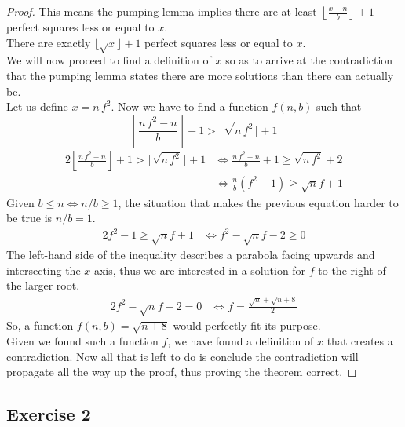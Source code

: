 {\begin{proof}
This means the pumping lemma implies there are at least $\left\lfloor \frac{x-n}{b} \right\rfloor +1$ perfect squares less or equal to $x$.\\
There are exactly $\lfloor \sqrt{x} \rfloor +1$ perfect squares less or equal to $x$.\\
We will now proceed to find a definition of $x$ so as to arrive at the contradiction that the pumping lemma states there are more solutions than there can actually be.\\
Let us define $x=n\,f^2$. Now we have to find a function $f(n,b)$ such that
\begin{equation*}
	\left\lfloor \frac{n\,f^2-n}{b} \right\rfloor +1 > \lfloor \sqrt{n\,f^2} \rfloor +1
\end{equation*}
\begin{alignat*}{2}
	\left\lfloor \frac{n\,f^2-n}{b} \right\rfloor +1 > \lfloor \sqrt{n\,f^2} \rfloor +1
	&\iff \frac{n\,f^2-n}{b}+1 \geq \sqrt{n\,f^2} +2 \\
	&\iff \frac{n}{b}(f^2-1) \geq \sqrt{n}f + 1
\end{alignat*}
Given $b \leq n \iff n/b \geq 1$, the situation that makes the previous equation harder to be true is $n/b=1$.
\begin{alignat*}{2}
	f^2-1 \geq \sqrt{n}f + 1
	&\iff f^2-\sqrt{n}f-2 \geq 0
\end{alignat*}
The left-hand side of the inequality describes a parabola facing upwards and intersecting the $x$-axis, thus we are interested in a solution for $f$ to the right of the larger root.
 \begin{alignat*}{2}
	f^2-\sqrt{n}f-2 = 0
	&\iff f = \frac{\sqrt{n}+\sqrt{n+8}}{2}
\end{alignat*}
So, a function $f(n,b)=\sqrt{n+8}$ would perfectly fit its purpose.\\
Given we found such a function $f$, we have found a definition of $x$ that creates a contradiction. Now all that is left to do is conclude the contradiction will propagate all the way up the proof, thus proving the theorem correct.
\end{proof}
\subsection{Exercise 2}
}
